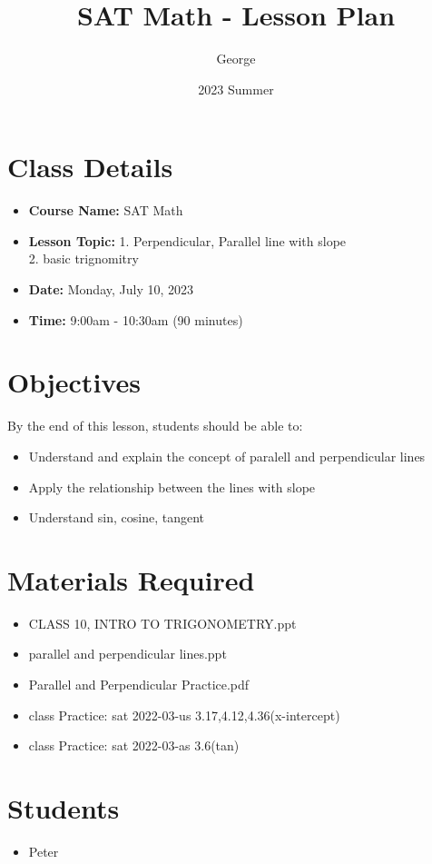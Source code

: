 \documentclass[12pt]{article}
\title{SAT Math - Lesson Plan}
\author{George}
\date{2023 Summer}
\begin{document}
\maketitle

\section{Class Details}
\begin{itemize}
    \item \textbf{Course Name:} SAT Math
    \item \textbf{Lesson Topic:} 1. Perpendicular, Parallel line with slope\\
     2.  basic trignomitry
    \item \textbf{Date:} Monday, July 10, 2023
    \item \textbf{Time:} 9:00am - 10:30am (90 minutes)
\end{itemize}

\section{Objectives}
By the end of this lesson, students should be able to:
\begin{itemize}
    \item Understand and explain the concept of paralell and perpendicular lines
    \item Apply the relationship between the lines with slope
    \item Understand sin, cosine, tangent
\end{itemize}

\section{Materials Required}
\begin{itemize}
   
    \item CLASS 10, INTRO TO TRIGONOMETRY.ppt
    \item parallel and perpendicular lines.ppt
    \item Parallel and Perpendicular Practice.pdf
    \item class Practice: sat 2022-03-us 3.17,4.12,4.36(x-intercept)
    \item class Practice: sat 2022-03-as 3.6(tan)
  
\end{itemize}


\section{Students}
\begin{itemize}
    \item Peter

\end{itemize}
\end{document}
